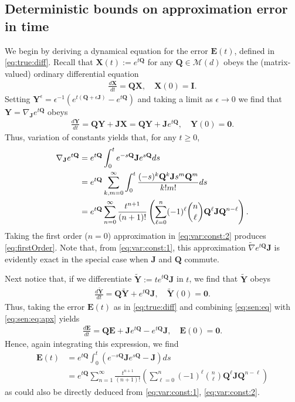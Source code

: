 \documentclass[9pt,twocolumn,twoside]{pnas-new}
\newcommand{\?}{\textbf{?}}
\newcommand{\X}{\textbf{X}}
\newcommand{\Y}{\textbf{Y}}
\newcommand{\QQ}{\mathbf{Q}}
\newcommand{\JJ}{\mathbf{J}}
\newcommand{\II}{\mathbf{I}}
\newcommand{\Zero}{\boldsymbol{0}}
\newcommand{\Z}{\mathbf{E}}
\begin{document}
\subsection*{Deterministic bounds on approximation
  error in time}

We begin by deriving a dynamical equation for the error $\Z(t)$, defined in
\eqref{eq:true:diff}. Recall that $\X(t) := e^{t \QQ}$ for any
$\QQ \in \mathcal{M}(d)$ obeys the (matrix-valued) ordinary
differential equation
\begin{align}
   \frac{d\X}{dt} = \QQ \X, \quad \X(0) = \II.
\end{align}
Setting
$\Y^\epsilon = \epsilon^{-1} ( e^{t (\QQ+ \epsilon \JJ)}- e^{t \QQ})$
and taking a limit as $\epsilon \to 0$ we find that
$\Y = \nabla_{\JJ} e^{t \QQ}$ obeys
\begin{align}
  \frac{d \Y}{dt}  = \QQ \Y + \JJ \X = \QQ \Y + \JJ e^{t \QQ},
  \quad \Y(0) = \Zero.
	\label{eq:sen:eq}
\end{align}
Thus, variation of constants yields that, for any $t \geq 0$,
\begin{align}
	\nabla_{\JJ} e^{t \QQ} &= e^{t \QQ} \int_0^t e^{-s\QQ} \JJ e^{s\QQ} ds \label{eq:var:const:1}\\
	&=  e^{t \QQ} \sum_{k,m = 0}^\infty \int_0^t \frac{(-s)^{k} \QQ^k \JJ s^{m}\QQ^m}{k!m!}ds
		\notag\\
	&=  e^{t \QQ} \sum_{n = 0}^\infty \frac{t^{n+1}}{(n+1)!}  
	\left( \sum_{\ell = 0}^n (-1)^\ell \binom{n}{\ell} \QQ^\ell \JJ \QQ^{n -\ell}\right).
	\label{eq:var:const:2}
\end{align}
Taking the first order ($n=0$) approximation in \eqref{eq:var:const:2} produces
\eqref{eq:firstOrder}.  Note that, from \eqref{eq:var:const:1}, this
approximation $\widetilde{\nabla}e^{t\QQ}\JJ$ is evidently exact in the
special case when $\JJ$ and $\QQ$ commute.


Next notice that, if we differentiate $\widetilde{\Y} := t e^{t \QQ} \JJ$ in $t$, we
find that $\widetilde{\Y}$ obeys
\begin{align}\label{eq:sen:eq:apx}
  \frac{d \widetilde{\Y}}{dt} = \QQ \widetilde{\Y} +  e^{t \QQ} \JJ,
  \quad \widetilde{\Y}(0) = \Zero.
\end{align}
Thus, taking the error $\Z(t)$ as in \eqref{eq:true:diff} and
combining \eqref{eq:sen:eq} with \eqref{eq:sen:eq:apx} yields
\begin{align}
\label{eq:Z:dym}
  \frac{d\Z}{dt} = \QQ \Z + \JJ e^{t \QQ} -  e^{t \QQ} \JJ,
  \quad \Z(0) = \Zero.
\end{align}
Hence, again integrating this expression, we find
\begin{align}
  \Z(t) &= e^{t \QQ} \int_0^t (e^{-s \QQ} \JJ e^{s \QQ} - \JJ) ds
 \label{eq:ass:procs:0}\\
	&=  e^{t \QQ} \sum_{n = 1}^\infty \frac{t^{n+1}}{(n+1)!}  
   \left( \sum_{\ell = 0}^n (-1)^\ell
   \binom{n}{\ell} \QQ^\ell \JJ \QQ^{n -\ell}\right)
   \label{eq:ass:procs}
\end{align}
as could also be directly deduced from \eqref{eq:var:const:1},
\eqref{eq:var:const:2}.
\end{document}
